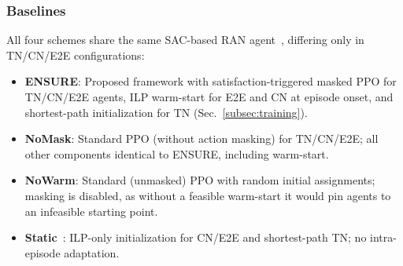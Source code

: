\documentclass[12pt,lettersize,journal,onecolumn]{IEEEtran}
\begin{document}
\subsubsection{Baselines}
All four schemes share the same SAC-based RAN agent~\cite{camad24ebrahimi}, differing only in TN/CN/E2E configurations:
\begin{itemize}[leftmargin=*]
\item \textbf{ENSURE}: Proposed framework with satisfaction-triggered masked PPO for TN/CN/E2E agents, ILP warm-start for E2E and CN at episode onset, and shortest-path initialization for TN (Sec.~\ref{subsec:training}).
\item \textbf{NoMask}: Standard PPO (without action masking) for TN/CN/E2E; all other components identical to ENSURE, including warm-start.
\item \textbf{NoWarm}: Standard (unmasked) PPO with random initial assignments; masking is disabled, as without a feasible warm-start it would pin agents to an infeasible starting point. %
\item \textbf{Static}~\cite{camad24ebrahimi}: ILP-only initialization for CN/E2E and shortest-path TN; no intra-episode adaptation.
\end{itemize}
\end{document}
